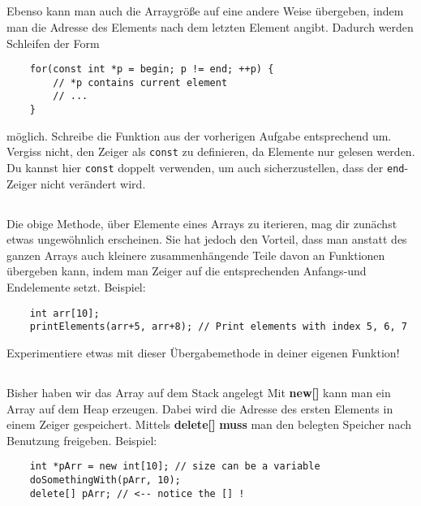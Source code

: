 \subsection{}
Ebenso kann man auch die Arraygröße auf eine andere Weise übergeben, indem man die Adresse des Elements nach dem letzten Element angibt.
Dadurch werden Schleifen der Form

\begin{lstlisting}
	for(const int *p = begin; p != end; ++p) {
		// *p contains current element
		// ...
	}
\end{lstlisting}

möglich.
Schreibe die Funktion aus der vorherigen Aufgabe entsprechend um.
Vergiss nicht, den Zeiger als \texttt{const} zu definieren, da Elemente nur gelesen werden.
Du kannst hier \texttt{const} doppelt verwenden, um auch sicherzustellen, dass der \texttt{end}-Zeiger nicht verändert wird.

\subsection{}
Die obige Methode, über Elemente eines Arrays zu iterieren, mag dir zunächst etwas ungewöhnlich erscheinen.
Sie hat jedoch den Vorteil, dass man anstatt des ganzen Arrays auch kleinere zusammenhängende Teile davon an Funktionen übergeben kann, indem man Zeiger auf die entsprechenden Anfangs-und Endelemente setzt.
Beispiel:

\begin{lstlisting}
	int arr[10];
	printElements(arr+5, arr+8); // Print elements with index 5, 6, 7
\end{lstlisting}

Experimentiere etwas mit dieser Übergabemethode in deiner eigenen Funktion!

\subsection{}
Bisher haben wir das Array auf dem Stack angelegt
Mit \textbf{new[]} kann man ein Array auf dem Heap erzeugen.
Dabei wird die Adresse des ersten Elements in einem Zeiger gespeichert.
Mittels \textbf{delete[]} \textbf{muss} man den belegten Speicher nach Benutzung freigeben.
Beispiel:

\begin{lstlisting}
	int *pArr = new int[10]; // size can be a variable
	doSomethingWith(pArr, 10);
	delete[] pArr; // <-- notice the [] !
\end{lstlisting}

